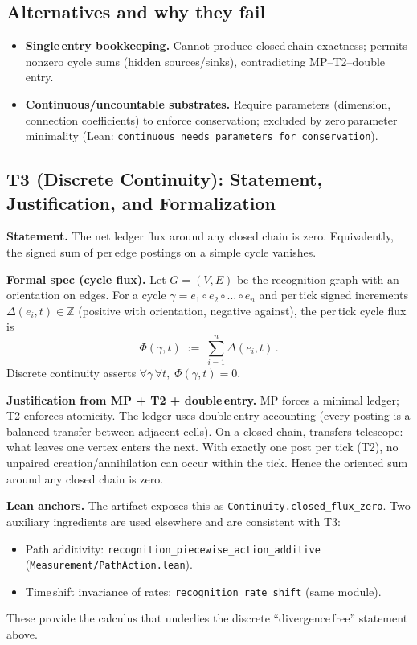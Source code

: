 \documentclass[11pt]{article}
\begin{document}
\subsection*{Alternatives and why they fail}
\begin{itemize}[leftmargin=*]
  \item \textbf{Single\,entry bookkeeping.} Cannot produce closed\,chain exactness; permits nonzero cycle sums (hidden sources/sinks), contradicting MP–T2–double\,entry.
  \item \textbf{Continuous/uncountable substrates.} Require parameters (dimension, connection coefficients) to enforce conservation; excluded by zero\,parameter minimality (Lean: \texttt{continuous\_needs\_parameters\_for\_conservation}).
\end{itemize}

\subsection*{T3 (Discrete Continuity): Statement, Justification, and Formalization}
\textbf{Statement.} The net ledger flux around any closed chain is zero. Equivalently, the signed sum of per\,edge postings on a simple cycle vanishes.

\medskip
\textbf{Formal spec (cycle flux).} Let $G=(V,E)$ be the recognition graph with an orientation on edges. For a cycle $\gamma=e_1\circ e_2\circ\dots\circ e_n$ and per\,tick signed increments $\Delta(e_i,t)\in\mathbb Z$ (positive with orientation, negative against), the per\,tick cycle flux is
\begin{equation*}
  \Phi(\gamma,t) \;:=\; \sum_{i=1}^n \Delta(e_i,t)\,.
\end{equation*}
Discrete continuity asserts $\forall \gamma\,\forall t,\; \Phi(\gamma,t)=0$.

\textbf{Justification from MP + T2 + double\,entry.} MP forces a minimal ledger; T2 enforces atomicity. The ledger uses double\,entry accounting (every posting is a balanced transfer between adjacent cells). On a closed chain, transfers telescope: what leaves one vertex enters the next. With exactly one post per tick (T2), no unpaired creation/annihilation can occur within the tick. Hence the oriented sum around any closed chain is zero.

\textbf{Lean anchors.} The artifact exposes this as \texttt{Continuity.closed\_flux\_zero}. Two auxiliary ingredients are used elsewhere and are consistent with T3:
\begin{itemize}[leftmargin=*]
  \item Path additivity: \texttt{recognition\_piecewise\_action\_additive} (\texttt{Measurement/PathAction.lean}).
  \item Time\,shift invariance of rates: \texttt{recognition\_rate\_shift} (same module).
\end{itemize}
These provide the calculus that underlies the discrete “divergence\,free” statement above.
\end{document}
